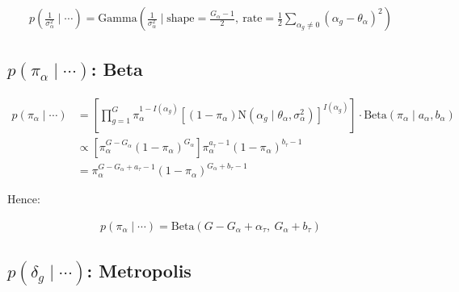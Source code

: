 \documentclass{article}\usepackage{graphicx, color}
\begin{document}
\begin{flushleft}
\begin{align*}
p( \frac{1}{\sigma_\alpha^2} \mid \cdots ) = \text{Gamma} \left (\frac{1}{\sigma_\alpha^2} \mid \text{shape} = \frac{G_\alpha - 1}{2}, \ \text{rate} = \frac{1}{2} \sum_{\alpha_g \ne 0} (\alpha_g - \theta_\alpha)^2 \right )
\end{align*}






\subsection{$p(\pi_\alpha \mid \cdots)$: Beta}

\begin{align*}
p(\pi_\alpha \mid \cdots) &=\left [ \prod_{g = 1}^G  \pi_\alpha^{1-I(\alpha_g)}[(1- \pi_\alpha)\text{N}(\alpha_g \mid \theta_\alpha, \sigma_\alpha^2)]^{I(\alpha_g)} \right ] \cdot \text{Beta}(\pi_\alpha \mid a_\alpha, b_\alpha)  \\
&\propto [\pi_\alpha^{G - G_\alpha}(1-\pi_\alpha)^{G_\alpha}] \pi_\alpha^{a_\tau - 1} (1 - \pi_\alpha)^{b_\tau - 1} \\
&= \pi_{\alpha}^{G - G_\alpha + a_\tau - 1}(1 - \pi_\alpha)^{G_\alpha + b_\tau - 1}
\end{align*}

Hence:

\begin{align*}
p(\pi_\alpha \mid \cdots) = \text{Beta}(G - G_\alpha + \alpha_\tau, \ G_\alpha + b_\tau)
\end{align*}


















\subsection{$p (\delta_g \mid \cdots)$: Metropolis}


\end{flushleft}
\end{document}
